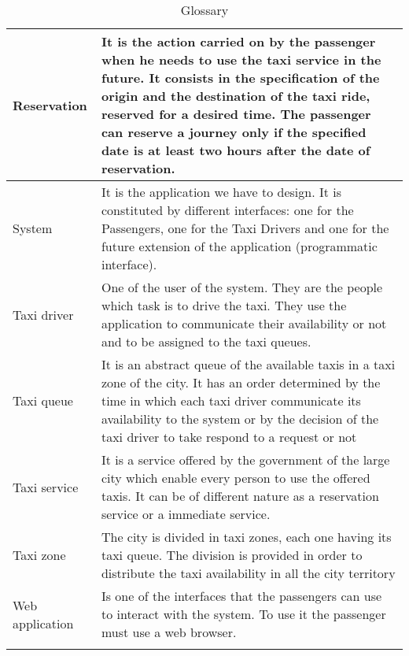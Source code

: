 \begin{center}
\begin{longtable}{| p{} | p{} |}
Reservation & It is the action carried on by the passenger when he needs to use the taxi service in the future. It consists in the specification of the origin and the destination of the taxi ride, reserved for a desired time. The passenger can reserve a journey only if the specified date is at least two hours after the date of reservation. \\ \hline
System & It is the application we have to design. It is constituted by different interfaces: one for the Passengers, one for the Taxi Drivers and one for the future extension of the application (programmatic interface). \\ \hline
Taxi driver & One of the user of the system. They are the people which task is to drive the taxi. They use the application to communicate their availability or not and to be assigned to the taxi queues. \\ \hline
Taxi queue & It is an abstract queue of the available taxis in a taxi zone of the city. It has an order determined by the time in which each taxi driver communicate its availability to the system or by the decision of the taxi driver to take respond to a request or not \\ \hline
Taxi service & It is a service offered by the government of the large city which enable every person to use the offered taxis. It can be of different nature as a reservation service or a immediate service. \\ \hline
Taxi zone & The city is divided in taxi zones, each one having its taxi queue. The division is provided in order to distribute the taxi availability in all the city territory \\ \hline
Web application & Is one of the interfaces that the passengers can use to interact with the system. To use it the passenger must use a web browser. \\ \hline
\caption{Glossary}
\end{longtable}
\end{center}
